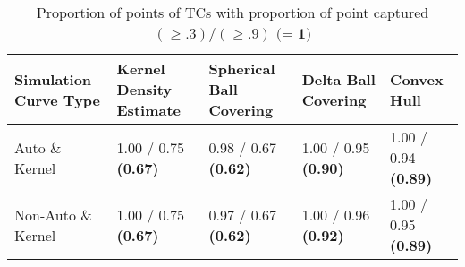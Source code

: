 \begin{table}[ht!]
\centering
\begin{tabular}{|R{1.2in}||L{.95in}L{.95in}|L{.95in}L{.95in}|}
  \hline
Simulation Curve Type & Kernel Density Estimate & Spherical Ball Covering & Delta Ball Covering & Convex Hull \\ 
  \hline
Auto \& Kernel & 1.00 / 0.75 \textbf{(0.67)} & 0.98 / 0.67 \textbf{(0.62)} & 1.00 / 0.95 \textbf{(0.90)} & 1.00 / 0.94 \textbf{(0.89)} \\ 
  Non-Auto \& Kernel & 1.00 / 0.75 \textbf{(0.67)} & 0.97 / 0.67 \textbf{(0.62)} & 1.00 / 0.96 \textbf{(0.92)} & 1.00 / 0.95 \textbf{(0.89)} \\ 
   \hline
\end{tabular}
\caption{Proportion of points of TCs with proportion of point captured  \((\geq .3) / (\geq .9)\) \(\textbf{(= 1)}\)} 
\label{tab:prop_captured}
\end{table}
